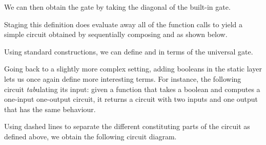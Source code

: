 We can then obtain the  gate by taking the diagonal
of the  built-in gate.


Staging this definition does evaluate away all of the function
calls to yield a simple circuit obtained by sequentially
composing  and  as shown below.


Using standard constructions, we can define  and 
in terms of the universal  gate.

\noindent
\begin{minipage}{.22\textwidth}
\end{minipage}\hfill
\begin{minipage}{.22\textwidth}
\end{minipage}

Going back to a slightly more complex setting, adding booleans in the
static layer lets us once again define more interesting terms.
For instance, the following  circuit \emph{tab}ulating its
input: given a function that takes a boolean and computes a one-input
one-output circuit, it returns a circuit with two inputs and one
output that has the same behaviour.


Using dashed lines to separate the different constituting parts
of the circuit as defined above, we obtain the following circuit
diagram.

